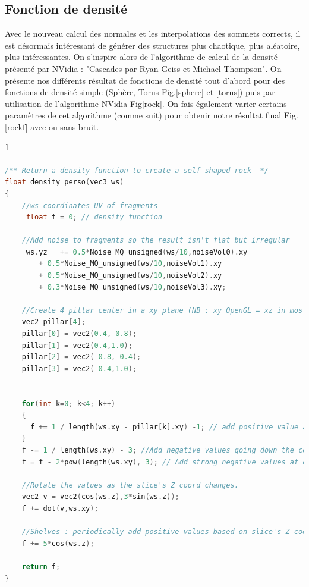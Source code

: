 \documentclass[a4paper]{article}
\begin{document}
\subsection{Fonction de densité}

Avec le nouveau calcul des normales et les interpolations des sommets corrects, il est désormais intéressant de générer des structures plus chaotique, plus aléatoire, plus intéressantes. On s'inspire alors de l'algorithme de calcul de la densité présenté par NVidia : "Cascades par Ryan Geiss et Michael Thompson". On présente nos différents résultat de fonctions de densité tout d'abord pour des fonctions de densité simple (Sphère, Torus Fig.\ref{sphere} et \ref{torus}) puis par utilisation de l'algorithme NVidia Fig\ref{rock}. On fais également varier certains paramètres de cet algorithme (comme suit) pour obtenir notre résultat final Fig.\ref{rockf} avec ou sans bruit.

\begin{lstlisting}[language=C++,
                   directivestyle={\color{black}}
                   emph={int,char,double,float,unsigned},
                   emphstyle={\color{blue}}]]
                   
/** Return a density function to create a self-shaped rock  */
float density_perso(vec3 ws)
{
    //ws coordinates UV of fragments
     float f = 0; // density function
     
    //Add noise to fragments so the result isn't flat but irregular
     ws.yz   += 0.5*Noise_MQ_unsigned(ws/10,noiseVol0).xy 
	    + 0.5*Noise_MQ_unsigned(ws/10,noiseVol1).xy
	    + 0.5*Noise_MQ_unsigned(ws/10,noiseVol2).xy
	    + 0.3*Noise_MQ_unsigned(ws/10,noiseVol3).xy;
    
    //Create 4 pillar center in a xy plane (NB : xy OpenGL = xz in most of the case)
    vec2 pillar[4];
    pillar[0] = vec2(0.4,-0.8);
    pillar[1] = vec2(0.4,1.0);
    pillar[2] = vec2(-0.8,-0.4);
    pillar[3] = vec2(-0.4,1.0);

    
    for(int k=0; k<4; k++)
    {
      f += 1 / length(ws.xy - pillar[k].xy) -1; // add positive value at pillar
    }
    f -= 1 / length(ws.xy) - 3; //Add negative values going down the center (water flow channel)
    f = f - 2*pow(length(ws.xy), 3); // Add strong negative values at outer edge (Help to keep solid rock in bounds)
    
    //Rotate the values as the slice's Z coord changes. 
    vec2 v = vec2(cos(ws.z),3*sin(ws.z));
    f += dot(v,ws.xy);
    
    //Shelves : periodically add positive values based on slice's Z coord. 
    f += 5*cos(ws.z);
    
    return f;
}
\end{lstlisting}
\end{document}

